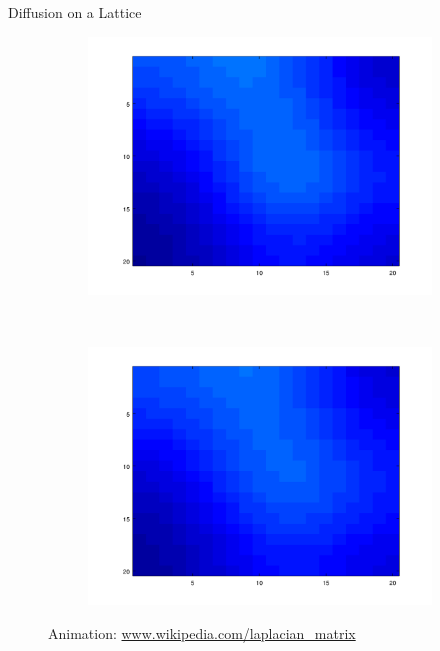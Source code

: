 \documentclass{beamer}
\begin{document}
\begin{frame}{Diffusion on a Lattice}
\begin{figure}[!h]
\begin{subfigure}[b]{0.25\textwidth}
    	\includegraphics[width= \textwidth]{images/anim_455.png}
    \end{subfigure}~
    \begin{subfigure}[b]{0.25\textwidth}
    	\includegraphics[width= \textwidth]{images/anim_500.png}
    \end{subfigure}
Animation: \url{www.wikipedia.com/laplacian_matrix}
\end{figure}
\end{frame}
\end{document}
